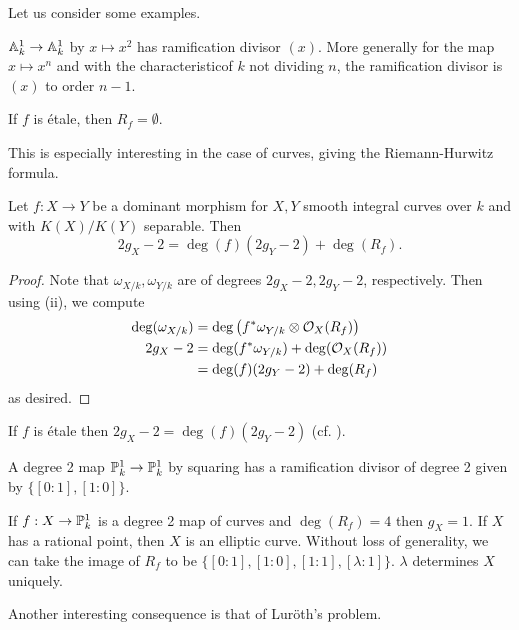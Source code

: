 Let us consider some examples. 
\begin{example}
    $\mathbb{A}^{1}_{k}\to\mathbb{A}^{1}_{k}$ by $x\mapsto x^{2}$ has ramification divisor $(x)$. More generally for the map $x\mapsto x^{n}$ and with the characteristicof $k$ not dividing $n$, the ramification divisor is $(x)$ to order $n-1$. 
\end{example}
\begin{example}\label{ex: etale map has empty ramification divisor}
    If $f$ is \'{e}tale, then $R_{f}=\emptyset$. 
\end{example}
This is especially interesting in the case of curves, giving the Riemann-Hurwitz formula. 
\begin{proposition}\label{prop: Riemann-Hurwitz}
    Let $f:X\to Y$ be a dominant morphism for $X,Y$ smooth integral curves over $k$ and with $K(X)/K(Y)$ separable. Then 
    $$2g_{X}-2=\deg(f)(2g_{Y}-2)+\deg(R_{f}).$$
\end{proposition}
\begin{proof}
    Note that $\omega_{X/k},\omega_{Y/k}$ are of degrees $2g_{X}-2,2g_{Y}-2$, respectively. Then using  (ii), we compute 
    \begin{align*}
        \deg(\omega_{X/k}) &= \deg\left(f^{*}\omega_{Y/k}\otimes\mathcal{O}_{X}(R_{f})\right) \\
        2g_{X}-2 &= \deg(f^{*}\omega_{Y/k})+\deg(\mathcal{O}_{X}(R_{f})) \\
        &= \deg(f)(2g_{Y}-2)+\deg(R_{f})
    \end{align*}
    as desired. 
\end{proof}
\begin{example}
    If $f$ is \'{e}tale then $2g_{X}-2=\deg(f)(2g_{Y}-2)$ (cf. ). 
\end{example}
\begin{example}
    A degree 2 map $\mathbb{P}^{1}_{k}\to\mathbb{P}^{1}_{k}$ by squaring has a ramification divisor of degree 2 given by $\{[0:1],[1:0]\}$. 
\end{example}
\begin{example}
    If $f:X\to\mathbb{P}^{1}_{k}$ is a degree 2 map of curves and $\deg(R_{f})=4$ then $g_{X}=1$. If $X$ has a rational point, then $X$ is an elliptic curve. Without loss of generality, we can take the image of $R_{f}$ to be $\{[0:1],[1:0],[1:1],[\lambda:1]\}$. $\lambda$ determines $X$ uniquely. 
\end{example}
Another interesting consequence is that of Lur\"{o}th's problem. 
